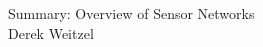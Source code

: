 \documentclass[12pt]{article}
\begin{document}
\begin{center}
{\huge Summary: Overview of Sensor Networks } \\
Derek Weitzel
\end{center}
\end{document}
